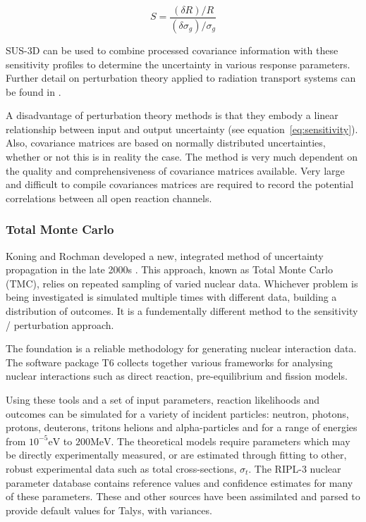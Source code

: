\begin{equation}
  \label{eq:sensitivity}
  S = \frac{(\delta R)/R}{(\delta \sigma_{g}) / \sigma_{g}}
\end{equation}

SUS-3D can be used to combine processed covariance information with these sensitivity profiles to determine the uncertainty in various response parameters. Further detail on perturbation theory applied to radiation transport systems can be found in \cite{Sabouri2013}.

A disadvantage of perturbation theory methods is that they embody a linear relationship between input and output uncertainty (see equation~\ref{eq:sensitivity}). Also, covariance matrices are based on normally distributed uncertainties, whether or not this is in reality the case. The method is very much dependent on the quality and comprehensiveness of covariance matrices available. Very large and difficult to compile covariances matrices are required to record the potential correlations between all open reaction channels. 


\FloatBarrier
\subsubsection{Total Monte Carlo}
\label{subsubsec:tmc}
Koning and Rochman developed a new, integrated method of uncertainty propagation in the late 2000s \cite{Koning2008}. This approach, known as Total Monte Carlo (TMC), relies on repeated sampling of varied nuclear data. Whichever problem is being investigated is simulated multiple times with different data, building a distribution of outcomes. It is a fundementally different method to the sensitivity / perturbation approach. 

The foundation is a reliable methodology for generating nuclear interaction data. The software package T6 \cite{Koning2005} collects together various frameworks for analysing nuclear interactions such as direct reaction, pre-equilibrium and fission models. 

Using these tools and a set of input parameters, reaction likelihoods and outcomes can be simulated for a variety of incident particles: neutron, photons, protons, deuterons, tritons helions and alpha-particles and for a range of energies from $10^{-5}\mathrm{eV}$ to $200\mathrm{MeV}$. The theoretical models require parameters which may be directly experimentally measured, or are estimated through fitting to other, robust experimental data such as total cross-sections, $\sigma_{t}$. The RIPL-3 nuclear parameter database \cite{Capote2009} contains reference values and confidence estimates for many of these parameters. These and other sources have been assimilated and parsed to provide default values for Talys, with variances. 

